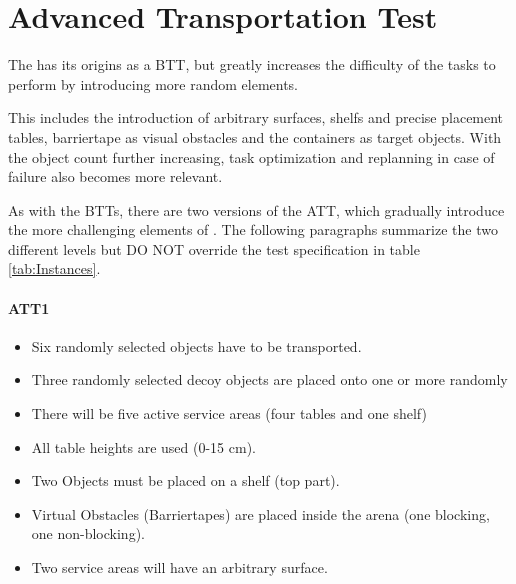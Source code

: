 
\section{Advanced Transportation Test}
\label{sec:Advanced Transportation Test}

The  has its origins as a BTT, but greatly increases the difficulty of the tasks to perform by introducing more random elements. 

This includes the introduction of arbitrary surfaces, shelfs and precise placement tables, barriertape as visual obstacles and the containers as target objects. With the object count further increasing, task optimization and replanning in case of failure also becomes more relevant.

As with the BTTs, there are two versions of the ATT, which gradually introduce the more challenging elements of \RCAW.
The following paragraphs summarize the two different levels but DO NOT override the test specification in table \ref{tab:Instances}.

\paragraph{ATT1}
\begin{itemize}
\item Six randomly selected objects have to be transported.
\item Three randomly selected decoy objects are placed onto one or more randomly
\item There will be five active service areas (four tables and one shelf)
\item All table heights are used (0-15 $\si{\centi\meter}$).
\item Two Objects must be placed on a shelf (top part).
\item Virtual Obstacles (Barriertapes) are placed inside the arena (one blocking, one non-blocking).
\item Two service areas will have an arbitrary surface.
\end{itemize}

